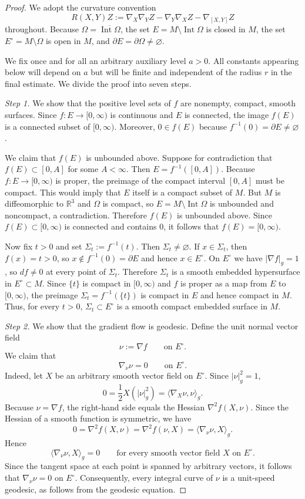 \documentclass[12pt,oneside,a4paper]{article}
\theoremstyle{mytheorem}
\theoremstyle{remark}
\begin{document}
\begin{proof}
We adopt the curvature convention
\[
R(X,Y)Z:=\nabla_X\nabla_YZ-\nabla_Y\nabla_XZ-\nabla_{[X,Y]}Z
\]
throughout. 
Because $\Omega=\overline{\operatorname{Int}\Omega}$, the set $E=M\setminus\operatorname{Int}\Omega$ is closed in $M$, the set $E^\circ=M\setminus\Omega$ is open in $M$, and $\partial E=\partial\Omega\neq\varnothing$.

We fix once and for all an arbitrary auxiliary level $a>0$. All constants appearing below will depend on $a$ but will be finite and independent of the radius $r$ in the final estimate. We divide the proof into seven steps.

\textit{Step 1.} We show that the positive level sets of \( f \) are nonempty, compact, smooth surfaces.
Since $f:E\to[0,\infty)$ is continuous and $E$ is connected, the image $f(E)$ is a connected subset of $[0,\infty)$. Moreover, $0\in f(E)$ because $f^{-1}(0)=\partial E\neq\varnothing$.

 We claim that $f(E)$ is unbounded above. Suppose for contradiction that $f(E) \subset [0, A]$ for some $A < \infty$. Then $E = f^{-1}([0, A])$. Because $f: E \to [0, \infty)$ is proper, the preimage of the compact interval $[0, A]$ must be compact. This would imply that $E$ itself is a compact subset of $M$. But $M$ is diffeomorphic to $\mathbb{R}^3$ and $\Omega$ is compact, so $E=M\setminus\operatorname{Int}\Omega$ is unbounded and  noncompact, a contradiction. Therefore $f(E)$ is unbounded above. Since $f(E)\subset[0,\infty)$ is connected and contains $0$, it follows that $f(E)=[0,\infty)$.

Now fix $t>0$ and set $\Sigma_t:=f^{-1}(t)$. Then $\Sigma_t\neq\varnothing$. If $x\in\Sigma_t$, then $f(x)=t>0$, so $x\notin f^{-1}(0)=\partial E$ and hence $x\in E^\circ$. On $E^\circ$ we have $|\nabla f|_g=1$, so $df\neq 0$ at every point of $\Sigma_t$. Therefore $\Sigma_t$ is a smooth embedded hypersurface in $E^\circ\subset M$. Since $\{t\}$ is compact in $[0,\infty)$ and $f$ is proper as a map from $E$ to $[0,\infty)$, the preimage $\Sigma_t=f^{-1}(\{t\})$ is compact in $E$ and hence compact in $M$. Thus, for every $t>0$, $\Sigma_t\subset E^\circ$
is a smooth compact embedded surface in $M$.

\textit{Step 2.} We show that the gradient flow is geodesic.
Define the unit normal vector field
\[
\nu:=\nabla f\qquad\text{on }E^\circ.
\]
We claim that
\[
\nabla_\nu\nu=0\qquad\text{on }E^\circ.
\]
Indeed, let $X$ be an arbitrary smooth vector field on $E^\circ$. Since $|\nu|_g^2=1$,
\[
0=\frac12X(|\nu|_g^2)=\langle\nabla_X\nu,\nu\rangle_g.
\]
Because $\nu=\nabla f$, the right-hand side equals the Hessian
$\nabla^2f(X,\nu).$ Since the Hessian of a smooth function is symmetric, we have 
\[
0=\nabla^2f(X,\nu)=\nabla^2f(\nu,X)=\langle\nabla_\nu\nu,X\rangle_g.
\]
Hence
\[
\langle\nabla_\nu\nu,X\rangle_g=0\qquad\text{for every smooth vector field }X\text{ on }E^\circ.
\]
Since the tangent space at each point is spanned by arbitrary vectors, it follows that $\nabla_\nu\nu=0$ on $E^\circ$. Consequently, every integral curve of \( \nu \) is a unit-speed geodesic, as follows from the geodesic equation.


\end{proof}
\end{document}
